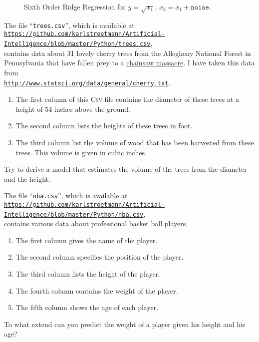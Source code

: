 \begin{figure}[!th]
\caption{Sixth Order Ridge Regression for $y = \sqrt{x_1}$, $x_2 = x_1 + \mathtt{noise}$.}
\label{fig:sqrt-6ridge.pdf}
\end{figure}

\pagebreak


\exercise
The file ``\texttt{trees.csv}'', which is available at
\\[0.2cm]
\hspace*{0.3cm}
\href{https://github.com/karlstroetmann/Artificial-Intelligence/blob/master/Python/trees.csv}{\texttt{https://github.com/karlstroetmann/Artificial-Intelligence/blob/master/Python/trees.csv}},
\\[0.2cm]
contains data about 31 lovely cherry trees from the Allegheny National Forest in Pennsylvania that have fallen
prey to a \href{https://en.wikipedia.org/wiki/The_Texas_Chain_Saw_Massacre}{chainsaw massacre}.  I have taken this data from
\\[0.2cm]
\hspace*{1.3cm}
\href{http://www.statsci.org/data/general/cherry.txt}{\texttt{http://www.statsci.org/data/general/cherry.txt}}.
\begin{enumerate}
\item The first column of this \textsc{Csv} file contains the diameter of these trees at a height of 54 inches above
      the ground.
\item The second column lists the heights of these trees in foot.
\item The third column list the volume of wood that has been harvested from these trees.  This volume is given
      in cubic inches.
\end{enumerate}
Try to derive a model that estimates the volume of the trees from the diameter and the height.
\eox
\pagebreak

\exercise
The file ``\texttt{nba.csv}'', which is available at
\\[0.2cm]
\hspace*{0.3cm}
\href{https://github.com/karlstroetmann/Artificial-Intelligence/blob/master/Python/nba.csv}{\texttt{https://github.com/karlstroetmann/Artificial-Intelligence/blob/master/Python/nba.csv}},
\\[0.2cm]
contains various data about professional basket ball players.
\begin{enumerate}
\item The first column gives the name of the player.
\item The second column specifies the position of the player.
\item The third column lists the height of the player.
\item The fourth column contains the weight of the player.
\item The fifth column shows the age of each player.
\end{enumerate}
To what extend can you predict the weight of a player given his height and his age?
\eox



